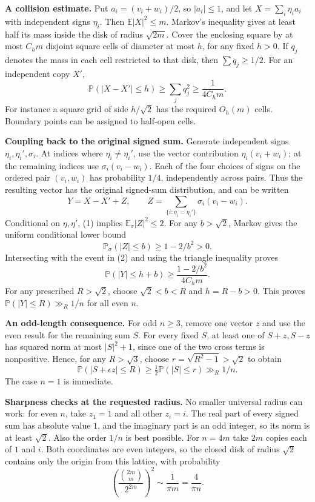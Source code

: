 \textbf{A collision estimate.} Put $a_i=(v_i+w_i)/2$, so $|a_i|\leq1$, and let $X=\sum_i\eta_i a_i$ with independent signs $\eta_i$. Then $\mathbb E|X|^2\leq m$. Markov's inequality gives at least half its mass inside the disk of radius $\sqrt{2m}$. Cover the enclosing square by at most $C_hm$ disjoint square cells of diameter at most $h$, for any fixed $h>0$. If $q_j$ denotes the mass in each cell restricted to that disk, then $\sum q_j\geq1/2$. For an independent copy $X'$,
\[
\mathbb P(|X-X'|\leq h)\geq\sum_jq_j^2\geq\frac1{4C_hm}. \tag{2}
\]
For instance a square grid of side $h/\sqrt2$ has the required $O_h(m)$ cells. Boundary points can be assigned to half-open cells.

\textbf{Coupling back to the original signed sum.} Generate independent signs $\eta_i,\eta_i',\sigma_i$. At indices where $\eta_i\ne\eta_i'$, use the vector contribution $\eta_i(v_i+w_i)$; at the remaining indices use $\sigma_i(v_i-w_i)$. Each of the four choices of signs on the ordered pair $(v_i,w_i)$ has probability $1/4$, independently across pairs. Thus the resulting vector has the original signed-sum distribution, and can be written
\[
Y=X-X'+Z,\qquad
Z=\sum_{\{i:\eta_i=\eta_i'\}}\sigma_i(v_i-w_i).
\]
Conditional on $\eta,\eta'$, (1) implies $\mathbb E_\sigma|Z|^2\leq2$. For any $b>\sqrt2$, Markov gives the uniform conditional lower bound
\[
\mathbb P_\sigma(|Z|\leq b)\geq1-2/b^2>0.
\]
Intersecting with the event in (2) and using the triangle inequality proves
\[
\mathbb P(|Y|\leq h+b)\geq\frac{1-2/b^2}{4C_hm}.         \tag{3}
\]
For any prescribed $R>\sqrt2$, choose $\sqrt2<b<R$ and $h=R-b>0$. This proves $\mathbb P(|Y|\leq R)\gg_R1/n$ for all even $n$.

\textbf{An odd-length consequence.} For odd $n\geq3$, remove one vector $z$ and use the even result for the remaining sum $S$. For every fixed $S$, at least one of $S+z,S-z$ has squared norm at most $|S|^2+1$, since one of the two cross terms is nonpositive. Hence, for any $R>\sqrt3$, choose $r=\sqrt{R^2-1}>\sqrt2$ to obtain
\[
\mathbb P(|S+\epsilon z|\leq R)\geq\tfrac12\mathbb P(|S|\leq r)
\gg_R1/n.
\]
The case $n=1$ is immediate.

\textbf{Sharpness checks at the requested radius.} No smaller universal radius can work: for even $n$, take $z_1=1$ and all other $z_i=i$. The real part of every signed sum has absolute value $1$, and the imaginary part is an odd integer, so its norm is at least $\sqrt2$. Also the order $1/n$ is best possible. For $n=4m$ take $2m$ copies each of $1$ and $i$. Both coordinates are even integers, so the closed disk of radius $\sqrt2$ contains only the origin from this lattice, with probability
\[
\left(\frac{\binom{2m}{m}}{2^{2m}}\right)^2\sim\frac1{\pi m}=\frac4{\pi n}.
\]

